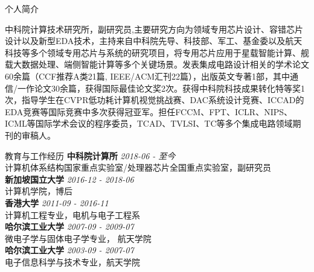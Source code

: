 \documentclass{resume} %
\begin{document}
\begin{rSection}{个人简介}
    \vspace{-1em}
\item 中科院计算技术研究所，副研究员,主要研究方向为领域专用芯片设计、容错芯片设计以及新型EDA技术，主持来自中科院先导、科技部、军工、基金委以及航天科技等多个领域专用芯片与系统的研究项目，将专用芯片应用于星载智能计算、舰载大数据处理、端侧智能计算等多个关键场景。发表集成电路设计相关的学术论文60余篇（CCF推荐A类21篇, IEEE/ACM汇刊22篇），出版英文专著1部，其中通信/一作论文30余篇，获得国际最佳论文奖2次。获得中科院科技成果转化特等奖1次，指导学生在CVPR低功耗计算机视觉挑战赛、DAC系统设计竞赛、ICCAD的EDA竞赛等国际竞赛中多次获得冠亚军。担任FCCM、FPT、ICLR、NIPS、ICML等国际学术会议的程序委员，TCAD、TVLSI、TC等多个集成电路领域期刊的审稿人。
    \vspace{-0.5em}
\end{rSection}

\begin{rSection}{教育与工作经历}
{\bf 中科院计算所} \hfill {\em 2018-06 - 至今} \\ 
计算机体系结构国家重点实验室/处理器芯片全国重点实验室，副研究员\\
{\bf 新加坡国立大学} \hfill {\em 2016-12 - 2018-06} \\ 
计算机学院，博后\\
{\bf 香港大学} \hfill {\em 2011-09 - 2016-11} \\ 
计算机工程专业，电机与电子工程系\\
{\bf 哈尔滨工业大学} \hfill {\em 2007-09 - 2009-07} \\
微电子学与固体电子学专业， 航天学院\\
{\bf 哈尔滨工业大学} \hfill {\em 2003-09 - 2007-07} \\
电子信息科学与技术专业，航天学院 \\

\end{rSection}
\end{document}
